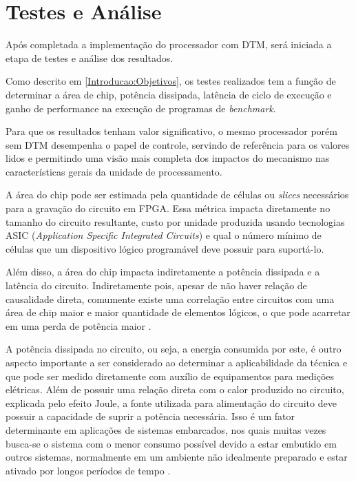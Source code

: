 \section{Testes e Análise}
\label{Metodologia:Analise}

Após completada a implementação do processador com DTM, será iniciada a etapa de testes e análise dos resultados. 


Como descrito em \ref{Introducao:Objetivos}, os testes realizados tem a função de determinar a área de chip, potência dissipada, latência de ciclo de execução e ganho de performance na execução de programas de \textit{benchmark}. %

Para que os resultados tenham valor significativo, o mesmo processador porém sem DTM desempenha o papel de controle, servindo de referência para os valores lidos e permitindo uma visão mais completa dos impactos do mecanismo nas características gerais da unidade de processamento.

A área do chip pode ser estimada pela quantidade de células ou \textit{slices} necessários para a gravação do circuito em FPGA. Essa métrica impacta diretamente no tamanho do circuito resultante, custo por unidade produzida usando tecnologias ASIC (\textit{Application Specific Integrated Circuits}) e qual o número mínimo de células que um dispositivo lógico programável deve possuir para suportá-lo.

Além disso, a área do chip impacta indiretamente a potência dissipada e a latência do circuito. Indiretamente pois, apesar de não haver relação de causalidade direta, comumente existe uma correlação entre circuitos com uma área de chip maior e maior quantidade de elementos lógicos, o que pode acarretar em uma perda de potência maior \cite{chu2006rtl}.

A potência dissipada no circuito, ou seja, a energia consumida por este, é outro aspecto importante a ser considerado ao determinar a aplicabilidade da técnica e que pode ser medido diretamente com auxílio de equipamentos para medições elétricas. Além de possuir uma relação direta com o calor produzido no circuito, explicada pelo efeito Joule, a fonte utilizada para alimentação do circuito deve possuir a capacidade de suprir a potência necessária. Isso é um fator determinante em aplicações de sistemas embarcados, nos quais muitas vezes busca-se o sistema com o menor consumo possível devido a estar embutido em outros sistemas, normalmente em um ambiente não idealmente preparado e estar ativado por longos períodos de tempo \cite{tanenbaum2009organizacao}.

